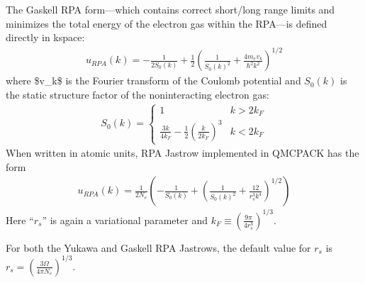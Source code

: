 \documentclass[letterpaper,10pt,english]{sphinxmanual}
\begin{document}
The Gaskell RPA form—which contains correct short/long range limits
and minimizes the total energy of the electron gas within the RPA—is
defined directly in k\sphinxhyphen{}space:
\begin{equation}\label{equation:intro_wavefunction:eq21}
\begin{split}u_{RPA}(k) = -\frac{1}{2S_0(k)}+\frac{1}{2}\left(\frac{1}{S_0(k)^2}+\frac{4m_ev_k}{\hbar^2k^2}\right)^{1/2}\end{split}
\end{equation}
where \$v\_k\$ is the Fourier transform of the Coulomb potential and
\(S_0(k)\) is the static structure factor of the non\sphinxhyphen{}interacting
electron gas:
\begin{equation*}
\begin{split}S_0(k) = \left.
    \begin{cases}
      1 &  k>2k_F \\
      \frac{3k}{4k_F}-\frac{1}{2}\left(\frac{k}{2k_F}\right)^3 & k<2k_F
    \end{cases}
    \right.\end{split}
\end{equation*}
When written in atomic units, RPA Jastrow implemented in QMCPACK has the
form
\begin{equation}\label{equation:intro_wavefunction:eq22}
\begin{split}u_{RPA}(k) = \frac{1}{2N_e}\left(-\frac{1}{S_0(k)}+\left(\frac{1}{S_0(k)^2}+\frac{12}{r_s^3k^4}\right)^{1/2}\right)\end{split}
\end{equation}
Here “\(r_s\)” is again a variational parameter and \(k_F\equiv(\tfrac{9\pi}{4r_s^3})^{1/3}\).

For both the Yukawa and Gaskell RPA Jastrows, the default value for \(r_s\) is \(r_s=(\tfrac{3\Omega}{4\pi N_e})^{1/3}\).
\end{document}
